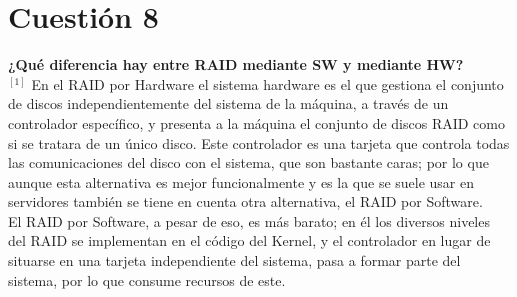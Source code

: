 \documentclass[a4paper, 11pt]{article} %
\begin{document}
\pagebreak

\section{Cuestión 8}
\textbf{¿Qué diferencia hay entre RAID mediante SW y mediante HW?}\\

$^{[1]}$ En el RAID por Hardware el sistema hardware es el que gestiona el conjunto de discos independientemente del sistema de la máquina, a través de un controlador específico, y presenta a la máquina el conjunto de discos RAID como si se tratara de un único disco. Este controlador es una tarjeta que controla todas las comunicaciones del disco con el sistema, que son bastante caras; por lo que aunque esta alternativa es mejor funcionalmente y es la que se suele usar en servidores también se tiene en cuenta otra alternativa, el RAID por Software. \\
El RAID por Software, a pesar de eso, es más barato; en él los diversos niveles del RAID se implementan en el código del Kernel, y el controlador en lugar de situarse en una tarjeta independiente del sistema, pasa a formar parte del sistema, por lo que consume recursos de este.
\end{document}
